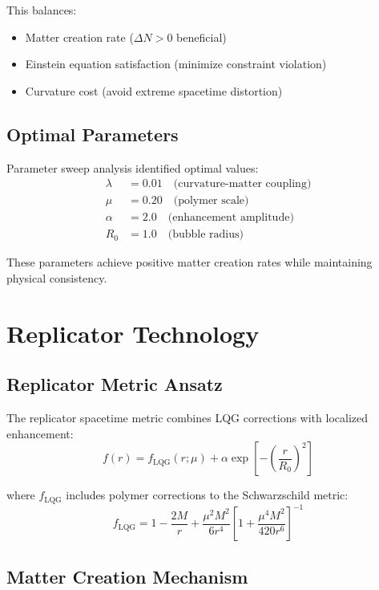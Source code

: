 \documentclass[11pt]{article}
\begin{document}
This balances:
\begin{itemize}
\item Matter creation rate ($\Delta N > 0$ beneficial)
\item Einstein equation satisfaction (minimize constraint violation)
\item Curvature cost (avoid extreme spacetime distortion)
\end{itemize}

\subsection{Optimal Parameters}

Parameter sweep analysis identified optimal values:
\begin{align}
\lambda &= 0.01 \quad \text{(curvature-matter coupling)} \\
\mu &= 0.20 \quad \text{(polymer scale)} \\
\alpha &= 2.0 \quad \text{(enhancement amplitude)} \\
R_0 &= 1.0 \quad \text{(bubble radius)}
\end{align}

These parameters achieve positive matter creation rates while maintaining physical consistency.

\section{Replicator Technology}

\subsection{Replicator Metric Ansatz}

The replicator spacetime metric combines LQG corrections with localized enhancement:
\begin{equation}
f(r) = f_{\text{LQG}}(r;\mu) + \alpha \exp\left[-\left(\frac{r}{R_0}\right)^2\right]
\end{equation}

where $f_{\text{LQG}}$ includes polymer corrections to the Schwarzschild metric:
\begin{equation}
f_{\text{LQG}} = 1 - \frac{2M}{r} + \frac{\mu^2 M^2}{6r^4}\left[1 + \frac{\mu^4 M^2}{420r^6}\right]^{-1}
\end{equation}

\subsection{Matter Creation Mechanism}
\end{document}

